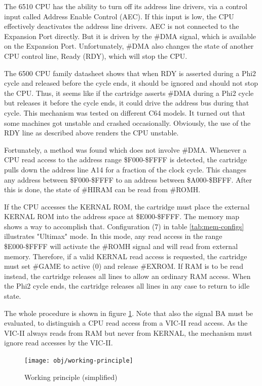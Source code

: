 \documentclass[a4paper,oneside]{memoir}
\begin{document}
The 6510 CPU has the ability to turn off its address line
drivers, via a control input called Address Enable Control (AEC). If
this input is low, the CPU effectively deactivates the address line
drivers. AEC is not connected to the Expansion
Port directly. But it is driven by the \#DMA signal, which is
available on the Expansion Port. Unfortunately, \#DMA also changes
the state of another CPU control line, Ready (RDY), which will stop
the CPU.

The 6500 CPU family datasheet shows that when RDY is asserted during a Phi2 cycle and released before the cycle ends, 
it should be ignored and should not stop the CPU. 
Thus, it seems like if the cartridge asserts \#DMA during a Phi2 cycle but releases it before the cycle ends, it could drive the address bus during that cycle.
This mechanism was tested on different C64 models. 
It turned out that some machines got unstable and crashed occasionally.
Obviously, the use of the RDY line as described above renders the CPU unstable.

Fortunately, a method was found which does not involve \#DMA.
Whenever a CPU read access to the address range \$F000-\$FFFF is detected, 
the cartridge pulls down the address line A14 for a fraction of the clock cycle.
This changes any address between \$F000-\$FFFF to an address between \$A000-\$BFFF.
After this is done, the state of \#HIRAM can be read from \#ROMH.

If the CPU accesses the KERNAL ROM, the cartridge must place the external KERNAL ROM into the address space at \$E000-\$FFFF.
The memory map shows a way to accomplish that.
Configuration (7) in table \ref {tab:mem-configs} illustrates "Ultimax" mode.
In this mode, any read access in the range \$E000-\$FFFF will activate the \#ROMH signal and will read from external memory.
Therefore, if a valid KERNAL read access is requested, the cartridge must set \#GAME to active (0) and release \#EXROM.
If RAM is to be read instead, the cartridge releases all lines to allow an ordinary RAM access.
When the Phi2 cycle ends, the cartridge releases all lines in any case to return to idle state.

The whole procedure is shown in figure \ref {fig:working-principle}. Note that also the signal BA must be evaluated, to distinguish a CPU read access from a VIC-II read access. As the VIC-II always reads from RAM but never from KERNAL, the mechanism must ignore read accesses by the VIC-II.
 
\begin{figure}
    \centering
    \texttt{[image: obj/working-principle]}
    \caption{Working principle (simplified)}
    \label{fig:working-principle}
\end{figure}
\end{document}
